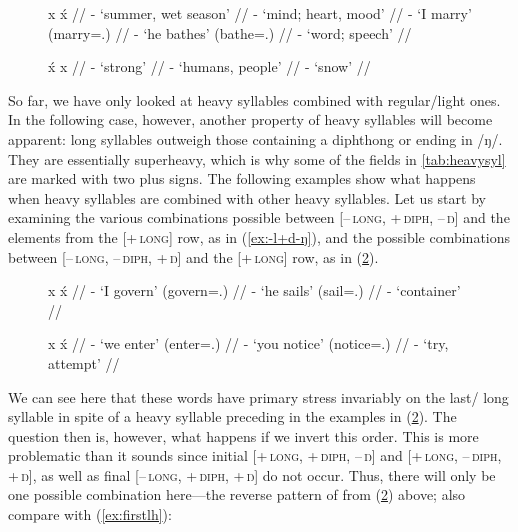 \begin{figure}[h]
\pex[everygla=\upshape]\label{ex:firstlh}
\a\label{ex:firstlight}\begingl
	\gla x		{}	x́	{} //
	\glb {}	-	
		{`summer, wet season'} //
	\glb {}	-		{`mind; heart, mood'} //
	\glb {}	-	
		{`I marry' (marry=\Fsg{}.\Top{})} //
	\glb {}	-	
		{`he bathes' (bathe=\TsgM{}.\Aarg{})} //
	\glb {}	-		{`word; speech'} //
\endgl

\a\label{ex:firstheavy}\begingl
	\gla x́		{}	x		{} //
	\glb {}	-			{`strong'} //
	\glb {}	-		{`humans, people'} //
	\glb {}	-			{`snow'} //
\endgl
\xe
\end{figure}

So far, we have only looked at heavy syllables combined with regular/light
ones. In the following case, however, another property of heavy syllables will
become apparent: long syllables outweigh those containing a diphthong or ending
in /ŋ/. They are essentially superheavy, which is
why some of the fields in \autoref{tab:heavysyl} are marked with two plus
signs. The following examples show what happens when heavy syllables are
combined with other heavy syllables. Let us start by examining the various
combinations possible between \textsc{[–\,long, +\,diph, –\,ŋ]} and the
elements from the \textsc{[+\,long]} row, as in (\ref{ex:-l+d-ŋ}), and the
possible combinations between \textsc{[\mbox{–\,long,} \mbox{–\,diph,} +\,ŋ]}
and the \textsc{[+\,long]} row, as in (\ref{ex:-l-d+ŋ}).

\begin{figure}[h]
\pex[everygla=\upshape]\label{ex:lastheavy}
\a\label{ex:-l+d-ŋ}\begingl
	\gla x		{}	x́		{} //
	\glb {}	-		{`I govern' 
		(govern=\Fsg{}.\Top{})} //
	\glb {}	-		{`he sails' 
		(sail=\TsgM{}.\Aarg{})} //
	\glb {}	-		{`container'} //
\endgl

\a\label{ex:-l-d+ŋ}\begingl
	\gla x		{}	x́		{} //
	\glb {}	-		{`we enter' 
		(enter=\Fpl{}.\Top{})} //
	\glb {}	-		{`you notice' 
		(notice=\Ssg{}.\Aarg{})} //
	\glb {}	-		{`try, attempt'} //
\endgl
\xe
\end{figure}

We can see here that these words have primary stress invariably on the last/%
long syllable in spite of a heavy syllable preceding in the examples in
(\ref{ex:-l-d+ŋ}). The question then is, however, what happens if we invert
this order. This is more problematic than it sounds since initial
\textsc{[+\,long, +\,diph, –\,ŋ]} and \textsc{[+\,long, –\,diph, +\,ŋ]}, as
well as final \textsc{[–\,long, +\,diph, +\,ŋ]} do not occur. Thus, there will
only be one possible combination here---the reverse pattern of
 from (\ref{ex:-l-d+ŋ}) above; also
compare with (\ref{ex:firstlh}):

